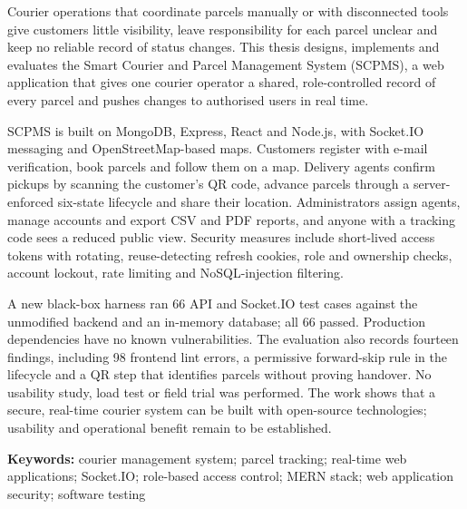 Courier operations that coordinate parcels manually or with disconnected tools give customers little visibility, leave responsibility for each parcel unclear and keep no reliable record of status changes. This thesis designs, implements and evaluates the Smart Courier and Parcel Management System (SCPMS), a web application that gives one courier operator a shared, role-controlled record of every parcel and pushes changes to authorised users in real time.

SCPMS is built on MongoDB, Express, React and Node.js, with Socket.IO messaging and OpenStreetMap-based maps. Customers register with e-mail verification, book parcels and follow them on a map. Delivery agents confirm pickups by scanning the customer's QR code, advance parcels through a server-enforced six-state lifecycle and share their location. Administrators assign agents, manage accounts and export CSV and PDF reports, and anyone with a tracking code sees a reduced public view. Security measures include short-lived access tokens with rotating, reuse-detecting refresh cookies, role and ownership checks, account lockout, rate limiting and NoSQL-injection filtering.

A new black-box harness ran 66 API and Socket.IO test cases against the unmodified backend and an in-memory database; all 66 passed. Production dependencies have no known vulnerabilities. The evaluation also records fourteen findings, including 98 frontend lint errors, a permissive forward-skip rule in the lifecycle and a QR step that identifies parcels without proving handover. No usability study, load test or field trial was performed. The work shows that a secure, real-time courier system can be built with open-source technologies; usability and operational benefit remain to be established.

\vspace{1em}
\noindent\textbf{Keywords:} courier management system; parcel tracking; real-time web applications; Socket.IO; role-based access control; MERN stack; web application security; software testing
